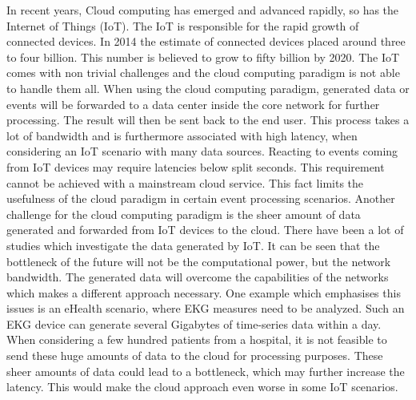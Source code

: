 \documentclass[draft,final,openany,oneside]{vutinfth} %
\begin{document}
In recent years, Cloud computing has emerged and advanced rapidly, so has the Internet of Things (IoT). The IoT is responsible for the rapid growth of connected devices. In 2014 the estimate of connected devices placed around three to four billion.\cite{IoTandAnalytics} This number is believed to grow to fifty billion by 2020.\cite{FindingYourWay} \newline
The IoT comes with non trivial challenges and the cloud computing paradigm is not able to handle them all.
When using the cloud computing paradigm, generated data or events will be forwarded to a data center inside the core network for further processing. The result will then be sent back to the end user. \cite{ASurveyOfFogComputing} This process takes a lot of bandwidth and is furthermore associated with high latency, when considering an IoT scenario with many data sources.
Reacting to events coming from IoT devices may require latencies below split seconds. This requirement cannot be achieved with a mainstream cloud service. \cite{OverviewReasearchOp}  This fact limits the usefulness of the cloud paradigm in certain event processing scenarios. \newline
Another challenge for the cloud computing paradigm is the sheer amount of data generated and forwarded from IoT devices to the cloud. There have been a lot of studies which investigate the data generated by IoT. It can be seen that the bottleneck of the future will not be the computational power, but the network bandwidth. The generated data will overcome the capabilities of the networks which makes a different approach necessary. \cite{FindingYourWay} \cite{FogComputingPrinciples} \newline
One example which emphasises this issues is an eHealth scenario, where EKG measures need to be analyzed. Such an EKG device can generate several Gigabytes of time-series data within a day. When considering a few hundred patients from a hospital, it is not feasible to send these huge amounts of data to the cloud for processing purposes. \cite{FogDrivenEHealth} \newline
These sheer amounts of data could lead to a bottleneck, which may further increase the latency. This would make the cloud approach even worse in some IoT scenarios. \newline
\end{document}
